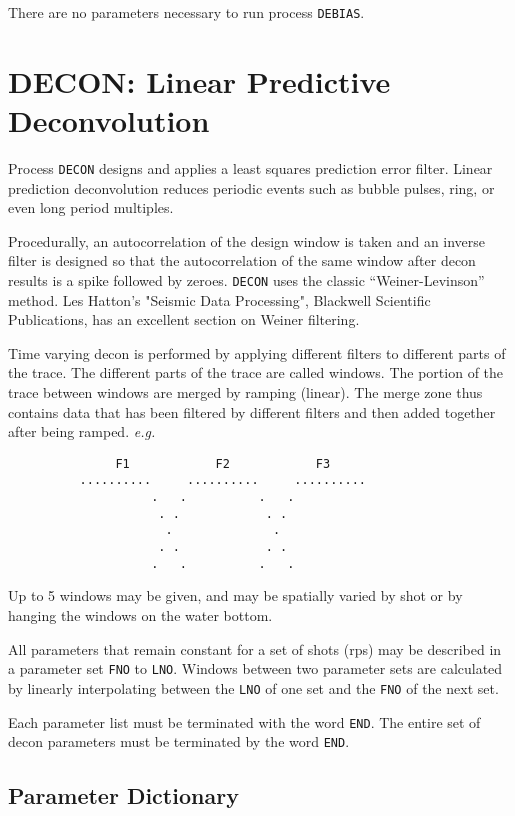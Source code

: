 There are no parameters necessary to run process \texttt{DEBIAS}.

\section{DECON: Linear Predictive Deconvolution}
\label{cmd_decon}

Process \texttt{DECON} designs and applies a least squares prediction error
filter.  Linear prediction deconvolution reduces periodic events such as
bubble pulses, ring, or even long period multiples.

Procedurally, an autocorrelation of the design window is taken and an
inverse filter is designed so that the autocorrelation of the same
window after decon results is a spike followed by zeroes.  \texttt{DECON} uses
the classic ``Weiner-Levinson'' method.  Les Hatton's "Seismic Data
Processing", Blackwell Scientific Publications, has an excellent section
on Weiner filtering.

Time varying decon is performed by applying different filters to
different parts of the trace.  The different parts of the trace are
called windows.  The portion of the trace between windows are merged by
ramping (linear).  The merge zone thus contains data that has been
filtered by different filters and then added together after being ramped.
\textit{e.g.}
\begin{verbatim}
               F1            F2            F3
          ..........     ..........     ..........
                    .   .          .   .
                     . .            . .
                      .              .
                     . .            . .
                    .   .          .   .
\end{verbatim}

Up to 5 windows may be given, and may be spatially varied by \gls{shot} or
by hanging the windows on the water bottom.

All parameters that remain constant for a set of \glspl{shot} (\glspl{rp}) may be
described in a parameter set \texttt{FNO} to \texttt{LNO}.  Windows between two parameter
sets are calculated by linearly interpolating between the \texttt{LNO} of one set
and the \texttt{FNO} of the next set.

Each parameter list must be terminated with the word \texttt{END}.  The entire
set of decon parameters must be terminated by the word \texttt{END}.

\subsection{Parameter Dictionary}

